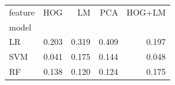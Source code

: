 \begin{tabular}{lrrrr}
\toprule
feature & HOG & LM & PCA & HOG+LM \\
model &  &  &  &  \\
\midrule
LR & 0.203 & 0.319 & 0.409 & 0.197 \\
SVM & 0.041 & 0.175 & 0.144 & 0.048 \\
RF & 0.138 & 0.120 & 0.124 & 0.175 \\
\bottomrule
\end{tabular}
